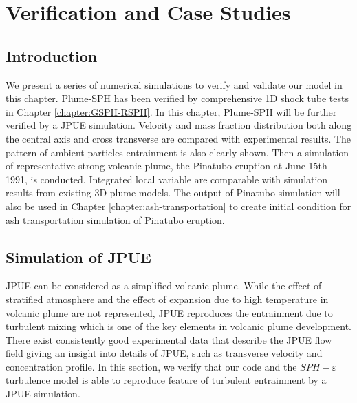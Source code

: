 \chapter{Verification and Case Studies} \label{chapter:case-studies}

\section{Introduction}
We present a series of numerical simulations to verify and validate our model in this chapter. Plume-SPH has been verified by comprehensive 1D shock tube tests in Chapter \ref{chapter:GSPH-RSPH}. In this chapter, Plume-SPH will be further verified by a JPUE simulation. Velocity and mass fraction distribution both along the central axis and cross transverse are compared with experimental results. The pattern of ambient particles entrainment is also clearly shown. Then a simulation of representative strong volcanic plume, the Pinatubo eruption at June 15th 1991, is conducted. Integrated local variable are comparable with simulation results from existing 3D plume models.
The output of Pinatubo simulation will also be used in Chapter \ref{chapter:ash-transportation} to create initial condition for ash transportation simulation of Pinatubo eruption.

\section{Simulation of JPUE}
JPUE can be considered as a simplified volcanic plume. While the effect of stratified atmosphere and the effect of expansion due to high temperature in volcanic plume are not represented, JPUE reproduces the entrainment due to turbulent mixing which is one of the key elements in volcanic plume development. There exist consistently good experimental data \citep { list1982turbulent,dimotakis1983structure, papanicolaou1988investigations, ezzamel2015dynamical} that describe the JPUE flow field giving an insight into details of JPUE, such as transverse velocity and concentration profile. In this section, we verify that our code and the $SPH-\varepsilon$ turbulence model is able to reproduce feature of turbulent entrainment by a JPUE simulation.

